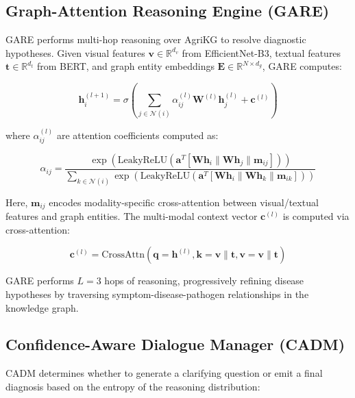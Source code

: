 \documentclass[conference]{IEEEtran}
\begin{document}
\subsection{Graph-Attention Reasoning Engine (GARE)}

GARE performs multi-hop reasoning over AgriKG to resolve diagnostic hypotheses. Given visual features $\mathbf{v} \in \mathbb{R}^{d_v}$ from EfficientNet-B3, textual features $\mathbf{t} \in \mathbb{R}^{d_t}$ from BERT, and graph entity embeddings $\mathbf{E} \in \mathbb{R}^{N \times d_g}$, GARE computes:

\begin{equation}
\mathbf{h}_i^{(l+1)} = \sigma\left(\sum_{j \in \mathcal{N}(i)} \alpha_{ij}^{(l)} \mathbf{W}^{(l)} \mathbf{h}_j^{(l)} + \mathbf{c}^{(l)}\right)
\end{equation}

where $\alpha_{ij}^{(l)}$ are attention coefficients computed as:

\begin{equation}
\alpha_{ij} = \frac{\exp\left(\text{LeakyReLU}\left(\mathbf{a}^T[\mathbf{W}\mathbf{h}_i \| \mathbf{W}\mathbf{h}_j \| \mathbf{m}_{ij}]\right)\right)}{\sum_{k \in \mathcal{N}(i)} \exp\left(\text{LeakyReLU}\left(\mathbf{a}^T[\mathbf{W}\mathbf{h}_i \| \mathbf{W}\mathbf{h}_k \| \mathbf{m}_{ik}]\right)\right)}
\end{equation}

Here, $\mathbf{m}_{ij}$ encodes modality-specific cross-attention between visual/textual features and graph entities. The multi-modal context vector $\mathbf{c}^{(l)}$ is computed via cross-attention:

\begin{equation}
\mathbf{c}^{(l)} = \text{CrossAttn}(\mathbf{q}=\mathbf{h}^{(l)}, \mathbf{k}=\mathbf{v}\|\mathbf{t}, \mathbf{v}=\mathbf{v}\|\mathbf{t})
\end{equation}

GARE performs $L=3$ hops of reasoning, progressively refining disease hypotheses by traversing symptom-disease-pathogen relationships in the knowledge graph.

\subsection{Confidence-Aware Dialogue Manager (CADM)}

CADM determines whether to generate a clarifying question or emit a final diagnosis based on the entropy of the reasoning distribution:
\end{document}
